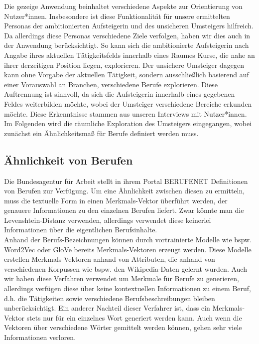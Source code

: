 \documentclass[10pt]{article}
\begin{document}
Die gezeige Anwendung beinhaltet verschiedene Aspekte zur Orientierung von
Nutzer*innen. Insbesondere ist diese Funktionalität für unsere ermittelten
Personas der ambitionierten Aufsteigerin und des unsicheren Umsteigers
hilfreich. Da allerdings diese Personas verschiedene Ziele verfolgen, haben wir
dies auch in der Anwendung berücksichtigt. So kann sich die ambitionierte
Aufsteigerin nach Angabe ihres aktuellen Tätigkeitsfelds innerhalb eines Raumes
Kurse, die nahe an ihrer derzeitigen Position liegen, explorieren. Der unsichere
Umsteiger dagegen kann ohne Vorgabe der aktuellen Tätigkeit, sondern
ausschließlich basierend auf einer Vorauswahl an Branchen, verschiedene Berufe
explorieren. Diese Auftrennung ist sinnvoll, da sich die Aufsteigerin innerhalb
eines gegebenen Feldes weiterbilden möchte, wobei der Umsteiger verschiedene
Bereiche erkunden möchte. Diese Erkenntnisse stammen aus unseren Interviews mit
Nutzer*innen. Im Folgenden wird die räumliche Exploration des Umsteigers
eingegangen, wobei zunächst ein Ähnlichkeitsmaß für Berufe definiert werden
muss.

\subsection{Ähnlichkeit von Berufen}

Die Bundesagentur für Arbeit stellt in ihrem Portal BERUFENET Definitionen von
Berufen zur Verfügung. Um eine Ähnlichkeit zwischen diesen zu ermitteln, muss
die textuelle Form in einen Merkmals-Vektor überführt werden, der genauere
Informationen zu den einzelnen Berufen liefert. Zwar könnte man die
Levenshtein-Distanz verwenden, allerdings verwendet diese keinerlei
Informationen über die eigentlichen Berufsinhalte.\\

 Anhand der Berufs-Bezeichnungen können durch vortrainierte Modelle wie bspw.
 Word2Vec oder GloVe bereits Merkmals-Vektoren erzeugt werden. Diese Modelle
 erstellen Merkmals-Vektoren anhand von Attributen, die anhand von verschiedenen
 Korpussen wie bspw. den Wikipedia-Daten gelernt wurden. Auch wir haben diese
 Verfahren verwendet um Merkmale für Berufe zu generieren, allerdings verfügen
 diese über keine kontextuellen Informationen zu einem Beruf, d.h. die
 Tätigkeiten sowie verschiedene Berufsbeschreibungen bleiben unberücksichtigt.
 Ein anderer Nachteil dieser Verfahrer ist, dass ein Merkmals-Vektor stets nur
 für ein einzelnes Wort generiert werden kann. Auch wenn die Vektoren über
 verschiedene Wörter gemittelt werden können, gehen sehr viele Informationen
 verloren.\\
\end{document}
